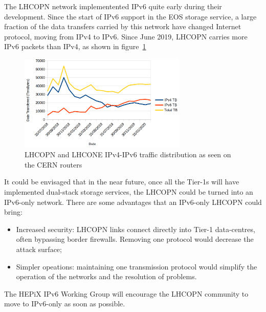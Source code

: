 
The LHCOPN network implementented IPv6 quite early during their development. 
Since the start of IPv6 support in the EOS storage service, a large fraction of the data transfers carried by this network have changed Internet protocol, moving from IPv4 to IPv6. Since June 2019, LHCOPN carries more IPv6 packets than IPv4, as shown in figure~\ref{fig:lhcopne-traffic}

\begin{figure}[h]
\centering
\includegraphics[width=8cm]{lhcopne-traffic.png}
\caption{LHCOPN and LHCONE IPv4-IPv6 traffic distribution as seen on the CERN routers\cite{RefLHCOPNEv4v6}  }
\label{fig:lhcopne-traffic}
\end{figure}


It could be envisaged that in the near future, once all the Tier-1s will have implemented dual-stack storage services, the LHCOPN could be turned into an IPv6-only network. There are some advantages that an IPv6-only LHCOPN could bring:
\begin{itemize}
  \item Increased security: LHCOPN links connect directly into Tier-1 data-centres, often bypassing border firewalls. Removing one protocol would decrease the attack surface;
  \item Simpler opeations: maintaining one transmission protocol would simplify the operation of the networks and the resolution of problems.
\end{itemize}

The HEPiX IPv6 Working Group will encourage the LHCOPN community to move to IPv6-only as soon as possible.




